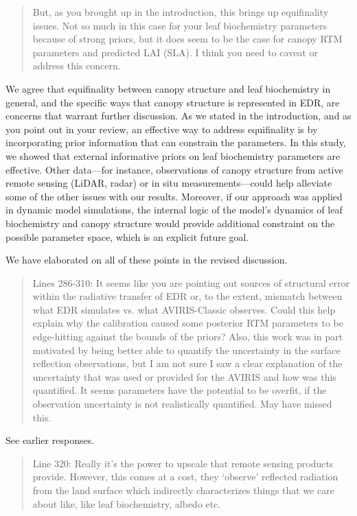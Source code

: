 \begin{quote}
  But, as you brought up in the introduction, this brings up equifinality issues. Not so much in this case for your leaf biochemistry parameters because of strong priors, but it does seem to be the case for canopy RTM parameters and predicted LAI (SLA). I think you need to caveat or address this concern.
\end{quote}

We agree that equifinality between canopy structure and leaf biochemistry in general, and the specific ways that canopy structure is represented in EDR, are concerns that warrant further discussion. As we stated in the introduction, and as you point out in your review, an effective way to address equifinality is by incorporating prior information that can constrain the parameters. In this study, we showed that external informative priors on leaf biochemistry parameters are effective. Other data---for instance, observations of canopy structure from active remote sensing (LiDAR, radar) or in situ measurements---could help alleviate some of the other issues with our results. Moreover, if our approach was applied in dynamic model simulations, the internal logic of the model’s dynamics of leaf biochemistry and canopy structure would provide additional constraint on the possible parameter space, which is an explicit future goal.

We have elaborated on all of these points in the revised discussion.

\begin{quote}
  Lines 286-310: It seems like you are pointing out sources of structural error within the radiative transfer of EDR or, to the extent, mismatch between what EDR simulates vs. what AVIRIS-Classic observes. Could this help explain why the calibration caused some posterior RTM parameters to be edge-hitting against the bounds of the priors? Also, this work was in part motivated by being better able to quantify the uncertainty in the surface reflection observations, but I am not sure I saw a clear explanation of the uncertainty that was used or provided for the AVIRIS and how was this quantified. It seems parameters have the potential to be overfit, if the observation uncertainty is not realistically quantified. May have missed this.
\end{quote}

See earlier responses.

\begin{quote}
  Line 320: Really it’s the power to upscale that remote sensing products provide. However, this comes at a cost, they ‘observe’ reflected radiation from the land surface which indirectly characterizes things that we care about like, like leaf biochemistry, albedo etc.
\end{quote}

